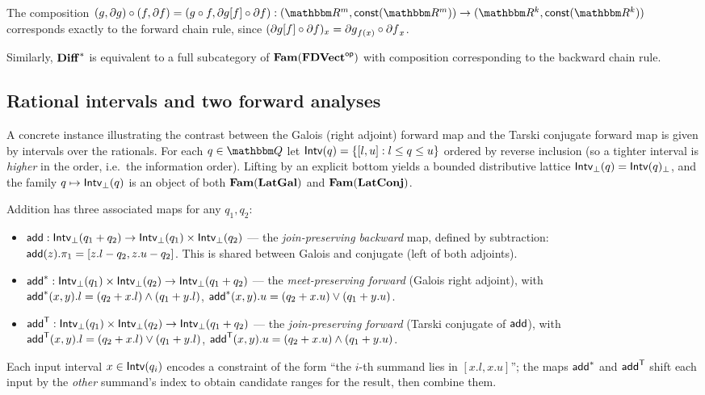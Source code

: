 \noindent The composition $(g, \partial g) \comp (f, \partial f) = (g \comp f, \reindex{\partial g}{f} \comp
\partial f): (\RR^m, \const(\RR^m)) \to (\RR^k, \const(\RR^k))$ corresponds exactly to the forward chain rule,
since $(\partial g[f] \circ \partial f)_x = {\partial g}_{f(x)} \circ {\partial f}_x$.

Similarly, $\mathbf{Diff}^*$ is equivalent to a full subcategory of $\mathbf{Fam}(\mathbf{FDVect}^{\mathsf{op}})$ with composition
corresponding to the backward chain rule.

\subsection{Rational intervals and two forward analyses}
\label{sec:galois-slicing-auto-diff-via-fam:rational-intervals}

A concrete instance illustrating the contrast between the Galois (right adjoint) forward map and the Tarski
conjugate forward map is given by intervals over the rationals. For each $q \in \QQ$ let $\mathsf{Intv}(q) = \{[l, u] :
l \leq q \leq u\}$ ordered by reverse inclusion (so a tighter interval is \emph{higher} in the order, i.e.\ the
information order). Lifting by an explicit bottom yields a bounded distributive lattice $\mathsf{Intv}_{\bot}(q) =
\mathsf{Intv}(q)_\bot$, and the family $q \mapsto \mathsf{Intv}_{\bot}(q)$ is an object of both $\mathbf{Fam}(\mathbf{LatGal})$ and $\mathbf{Fam}(\mathbf{LatConj})$.

Addition has three associated maps for any $q_1, q_2$:
\begin{itemize}
\item $\mathsf{add}: \mathsf{Intv}_{\bot}(q_1 + q_2) \to \mathsf{Intv}_{\bot}(q_1) \times \mathsf{Intv}_{\bot}(q_2)$ — the
  \emph{join-preserving backward} map, defined by subtraction: $\mathsf{add}(z).\pi_1 = [z.l - q_2, z.u - q_2]$. This
  is shared between Galois and conjugate (left of both adjoints).
\item $\mathsf{add}^*: \mathsf{Intv}_{\bot}(q_1) \times \mathsf{Intv}_{\bot}(q_2) \to \mathsf{Intv}_{\bot}(q_1 + q_2)$ — the \emph{meet-preserving forward}
  (Galois right adjoint), with $\mathsf{add}^*(x, y).l = (q_2 + x.l) \wedge (q_1 + y.l)$, $\mathsf{add}^*(x, y).u = (q_2 + x.u)
  \vee (q_1 + y.u)$.
\item $\mathsf{add}^{\mathsf{T}}: \mathsf{Intv}_{\bot}(q_1) \times \mathsf{Intv}_{\bot}(q_2) \to \mathsf{Intv}_{\bot}(q_1 + q_2)$ — the \emph{join-preserving forward}
  (Tarski conjugate of $\mathsf{add}$), with $\mathsf{add}^{\mathsf{T}}(x, y).l = (q_2 + x.l) \vee (q_1 + y.l)$, $\mathsf{add}^{\mathsf{T}}(x, y).u = (q_2 +
  x.u) \wedge (q_1 + y.u)$.
\end{itemize}

\noindent Each input interval $x \in \mathsf{Intv}(q_i)$ encodes a constraint of the form ``the $i$-th summand lies in
$[x.l, x.u]$''; the maps $\mathsf{add}^*$ and $\mathsf{add}^{\mathsf{T}}$ shift each input by the \emph{other} summand's index to obtain
candidate ranges for the result, then combine them.

